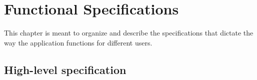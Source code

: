 \chapter{Functional Specifications}
\label{ch:func}

\newenvironment{specifications}{\newcommand*\spec{\addtocounter{specid}{10}\item[FS\thespecid]}\begin{itemize}}{\end{itemize}}

This chapter is meant to organize and describe the specifications that dictate the way the application functions for different users.

\section{High-level specification}

